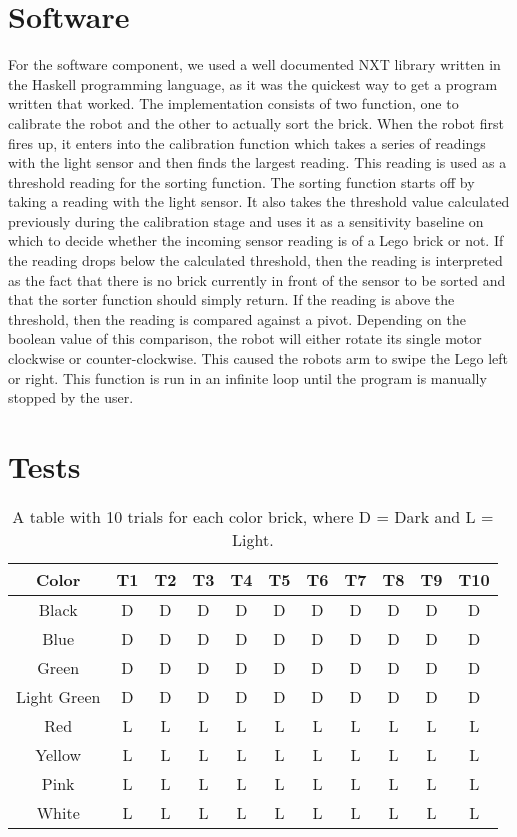 \documentclass{article}
\begin{document}
\section{Software}
For the software component, we used a well documented NXT library written in the Haskell programming language, as it was the quickest way to get a program written that worked.
The implementation consists of two function, one to calibrate the robot and the other to actually sort the brick.
When the robot first fires up, it enters into the calibration function which takes a series of readings with the light sensor and then finds the largest reading.
This reading is used as a threshold reading for the sorting function.
The sorting function starts off by taking a reading with the light sensor.
It also takes the threshold value calculated previously during the calibration stage and uses it as a sensitivity baseline on which to decide whether the incoming sensor reading is of a Lego brick or not.
If the reading drops below the calculated threshold, then the reading is interpreted as the fact that there is no brick currently in front of the sensor to be sorted and that the sorter function should simply return.
If the reading is above the threshold, then the reading is compared against a pivot.
Depending on the boolean value of this comparison, the robot will either rotate its single motor clockwise or counter-clockwise.
This caused the robots arm to swipe the Lego left or right.
This function is run in an infinite loop until the program is manually stopped by the user.

\section{Tests}
\begin{table}[H]
  \begin{center}
    \begin{tabular}{| c | c | c | c | c | c | c | c | c | c | c |}
      \hline
      Color   & T1 & T2 & T3 & T4 & T5 & T6 & T7 & T8 & T9 & T10 \\
      \hline
      Black   &   D &  D  &  D  &  D  &  D  &  D  &  D  &  D  &  D  &  D   \\
      Blue    & D   &  D  &  D  &  D  &  D  &  D  &  D  &  D  &  D  &  D   \\
      Green   &  D  &  D  &  D  &  D  &  D  &  D  & D   &  D  & D   &  D   \\
 Light Green  &  D  & D   &  D  &  D  &  D  &  D  &  D  &  D  & D   &  D   \\
      Red     &  L  & L   &   L &  L  &  L  &  L  &  L  &  L  & L   &  L   \\
      Yellow  & L   &  L  & L   & L   &  L  & L   & L   &  L  & L   &  L   \\
      Pink    & L   &  L  & L   & L   & L   &  L  &  L  & L   & L   &  L   \\
      White   &  L  &  L  & L   & L   &  L  & L   &  L  &  L  &  L  &  L   \\
      \hline
    \end{tabular}
  \end{center}
  \caption{A table with 10 trials for each color brick, where D = Dark and L = Light.}
\end{table}
\end{document}
